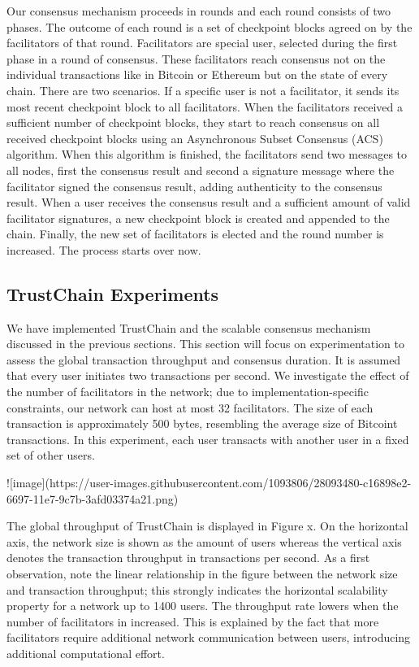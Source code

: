 \documentclass[USenglish]{article}
\begin{document}
Our consensus mechanism proceeds in rounds and each round consists of two phases.
The outcome of each round is a set of checkpoint blocks agreed on by the facilitators of that round.
Facilitators are special user, selected during the first phase in a round of consensus.
These facilitators reach consensus not on the individual transactions like in Bitcoin or Ethereum but on the state of every chain.
There are two scenarios.
If a specific user is not a facilitator, it sends its most recent checkpoint block to all facilitators.
When the facilitators received a sufficient number of checkpoint blocks, they start to reach consensus on all received checkpoint blocks using an Asynchronous Subset Consensus (ACS) algorithm.
When this algorithm is finished, the facilitators send two messages to all nodes, first the consensus result and second a signature message where the facilitator signed the consensus result, adding authenticity to the consensus result.
When a user receives the consensus result and a sufficient amount of valid facilitator signatures, a new checkpoint block is created and appended to the chain.
Finally, the new set of facilitators is elected and the round number is increased.
The process starts over now.

\subsection{TrustChain Experiments}

We have implemented TrustChain and the scalable consensus mechanism discussed in the previous sections.
This section will focus on experimentation to assess the global transaction throughput and consensus duration.
It is assumed that every user initiates two transactions per second.
We investigate the effect of the number of facilitators in the network; due to implementation-specific constraints, our network can host at most 32 facilitators.
The size of each transaction is approximately 500 bytes, resembling the average size of Bitcoint transactions.
In this experiment, each user transacts with another user in a fixed set of other users.

![image](https://user-images.githubusercontent.com/1093806/28093480-c16898e2-6697-11e7-9c7b-3afd03374a21.png)

The global throughput of TrustChain is displayed in Figure x.
On the horizontal axis, the network size is shown as the amount of users whereas the vertical axis denotes the transaction throughput in transactions per second.
As a first observation, note the linear relationship in the figure between the network size and transaction throughput; this strongly indicates the horizontal scalability property for a network up to 1400 users.
The throughput rate lowers when the number of facilitators in increased. This is explained by the fact that more facilitators require additional network communication between users, introducing additional computational effort.
\end{document}
